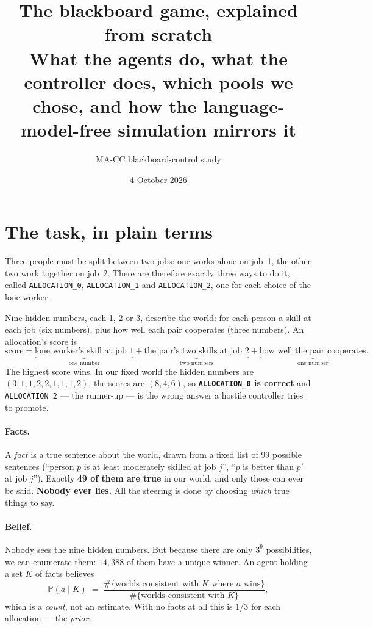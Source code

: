 \documentclass[11pt,a4paper]{article}
\title{\textbf{The blackboard game, explained from scratch}\\[2mm]
\large What the agents do, what the controller does, which pools we chose,
and how the language-model-free simulation mirrors it}
\author{MA-CC blackboard-control study}\date{4 October 2026}
\newcommand{\Prob}{\mathbb{P}}\newcommand{\A}[1]{\texttt{ALLOCATION\_#1}}
\begin{document}
\maketitle

\section{The task, in plain terms}

Three people must be split between two jobs: one works alone on job~1, the other
two work together on job~2. There are therefore exactly three ways to do it,
called \A{0}, \A{1} and \A{2}, one for each choice of the lone worker.

Nine hidden numbers, each 1, 2 or 3, describe the world: for each person a skill
at each job (six numbers), plus how well each pair cooperates (three numbers).
An allocation's score is
\[
\text{score} = \underbrace{\text{lone worker's skill at job 1}}_{\text{one number}}
+ \underbrace{\text{the pair's two skills at job 2}}_{\text{two numbers}}
+ \underbrace{\text{how well the pair cooperates}}_{\text{one number}} .
\]
The highest score wins. In our fixed world the hidden numbers are
$(3,1,1,2,2,1,1,1,2)$, the scores are $(8,4,6)$, so \textbf{\A{0} is correct} and
\A{2} --- the runner-up --- is the wrong answer a hostile controller tries to
promote.

\paragraph{Facts.} A \emph{fact} is a true sentence about the world, drawn from a
fixed list of 99 possible sentences (``person $p$ is at least moderately skilled
at job $j$'', ``$p$ is better than $p'$ at job $j$''). Exactly \textbf{49 of them
are true} in our world, and only those can ever be said. \textbf{Nobody ever
lies.} All the steering is done by choosing \emph{which} true things to say.

\paragraph{Belief.} Nobody sees the nine hidden numbers. But because there are
only $3^9$ possibilities, we can enumerate them: $14{,}388$ of them have a unique
winner. An agent holding a set $K$ of facts believes
\begin{equation}
\Prob(a \mid K) \;=\; \frac{\#\{\text{worlds consistent with } K \text{ where } a \text{ wins}\}}
{\#\{\text{worlds consistent with } K\}},
\label{eq:post}
\end{equation}
which is a \emph{count}, not an estimate. With no facts at all this is
$1/3$ for each allocation --- the \emph{prior}.
\end{document}
